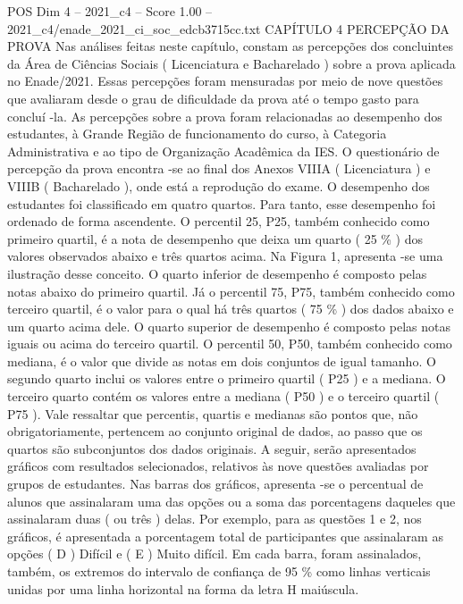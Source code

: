 \begin{textsample}{POS Dim 4 – 2021\_c4 – Score 1.00 – 2021\_c4/enade\_2021\_ci\_soc\_edcb3715cc.txt}  \label{ex:f4_pos_137}
CAPÍTULO 4 PERCEPÇÃO DA PROVA Nas análises feitas neste capítulo, constam as percepções dos concluintes da Área de Ciências Sociais ( Licenciatura e Bacharelado ) sobre a prova aplicada no Enade/2021.
Essas percepções foram mensuradas por meio de nove questões que avaliaram desde o grau de dificuldade da prova até o tempo gasto para concluí -la.
As percepções sobre a prova foram relacionadas ao desempenho dos estudantes, à Grande Região de funcionamento do curso, à Categoria Administrativa e ao tipo de Organização Acadêmica da IES.
O questionário de percepção da prova encontra -se ao final dos Anexos VIIIA ( Licenciatura ) e VIIIB ( Bacharelado ), onde está a reprodução do exame.
O desempenho dos estudantes foi classificado em quatro quartos.
Para tanto, esse desempenho foi ordenado de forma ascendente.
O percentil 25, P25, também conhecido como primeiro quartil, é a nota de desempenho que deixa um quarto ( 25 \% ) dos valores observados abaixo e três quartos acima.
Na Figura 1, apresenta -se uma ilustração desse conceito.
O quarto inferior de desempenho é composto pelas notas abaixo do primeiro quartil.
Já o percentil 75, P75, também conhecido como terceiro quartil, é o valor para o qual há três quartos ( 75 \% ) dos dados abaixo e um quarto acima dele.
O quarto superior de desempenho é composto pelas notas iguais ou acima do terceiro quartil.
O percentil 50, P50, também conhecido como mediana, é o valor que divide as notas em dois conjuntos de igual tamanho.
O segundo quarto inclui os valores entre o primeiro quartil ( P25 ) e a mediana.
O terceiro quarto contém os valores entre a mediana ( P50 ) e o terceiro quartil ( P75 ).
Vale ressaltar que percentis, quartis e medianas são pontos que, não obrigatoriamente, pertencem ao conjunto original de dados, ao passo que os quartos são subconjuntos dos dados originais.
A seguir, serão apresentados gráficos com resultados selecionados, relativos às nove questões avaliadas por grupos de estudantes.
Nas barras dos gráficos, apresenta -se o percentual de alunos que assinalaram uma das opções ou a soma das porcentagens daqueles que assinalaram duas ( ou três ) delas.
Por exemplo, para as questões 1 e 2, nos gráficos, é apresentada a porcentagem total de participantes que assinalaram as opções ( D ) Difícil e ( E ) Muito difícil.
Em cada barra, foram assinalados, também, os extremos do intervalo de confiança de 95 \% como linhas verticais unidas por uma linha horizontal na forma da letra H maiúscula.

\end{textsample}
